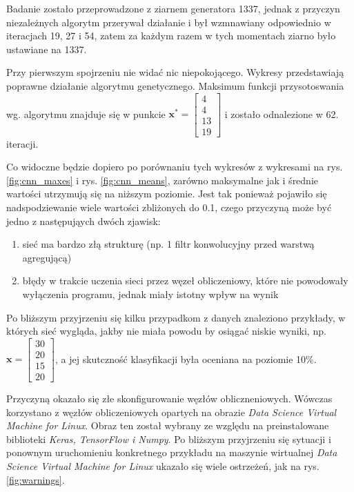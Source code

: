 Badanie zostało przeprowadzone z ziarnem generatora 1337, jednak z przyczyn niezależnych algorytm przerywał działanie i był wzmnawiany odpowiednio w iteracjach 19, 27 i 54, zatem za każdym razem w tych momentach ziarno było ustawiane na 1337.

Przy pierwszym spojrzeniu nie widać nic niepokojącego.
Wykresy przedstawiają poprawne działanie algorytmu genetycznego.
Maksimum funkcji przysotoswania wg. algorytmu znajduje się w punkcie $\mathbf{x^*} = \begin{bmatrix}4 \\ 4 \\ 13 \\ 19\end{bmatrix}$ i zostało odnalezione w 62. iteracji.

Co widoczne będzie dopiero po porównaniu tych wykresów z wykresami na rys. \ref{fig:cnn_maxes} i rys. \ref{fig:cnn_means}, zarówno maksymalne jak i średnie wartości utrzymują się na niższym poziomie.
Jest tak ponieważ pojawiło się nadspodziewanie wiele wartości zbliżonych do 0.1, czego przyczyną może być jedno z następująych dwóch zjawisk:
\begin{enumerate}
  \item sieć ma bardzo złą strukturę (np. 1 filtr konwolucyjny przed warstwą agregującą)
  \item błędy w trakcie uczenia sieci przez węzeł obliczeniowy, które nie powodowały wyłączenia programu, jednak miały istotny wpływ na wynik
\end{enumerate}
Po bliższym przyjrzeniu się kilku przypadkom z danych znaleziono przykłady, w których sieć wygląda, jakby nie miała powodu by osiągać niskie wyniki, np. $\mathbf{x} = \begin{bmatrix}30 \\ 20 \\ 15 \\ 20\end{bmatrix}$, a  jej skutczność klasyfikacji była oceniana na poziomie 10\%.

Przyczyną okazało się złe skonfigurowanie węzłów obliczneniowych.
Wówczas korzystano z węzłów obliczeniowych opartych na obrazie \textit{Data Science Virtual Machine for Linux}.
Obraz ten został wybrany ze względu na preinstalowane biblioteki \textit{Keras, TensorFlow i Numpy}.
Po bliższym przyjrzeniu się sytuacji i ponownym uruchomieniu konkretnego przykładu na maszynie wirtualnej \textit{Data Science Virtual Machine for Linux} ukazało się wiele ostrzeżeń, jak na rys. \ref{fig:warnings}.

